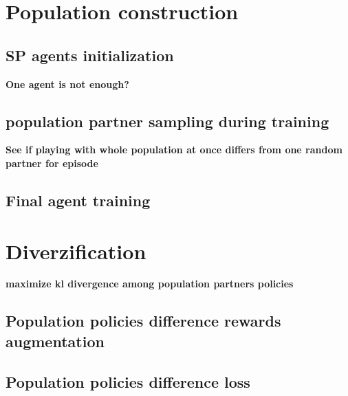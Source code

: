 \section{Population construction}

\subsection{SP agents initialization}
\textbf{One agent is not enough?}

\subsection{population partner sampling during training}
\textbf{See if playing with whole population at once differs from one random partner for episode}

\subsection{Final agent training}

\section{Diverzification}
\textbf{maximize kl divergence among population partners policies}

\subsection{Population policies difference rewards augmentation}

\subsection{Population policies difference loss}
